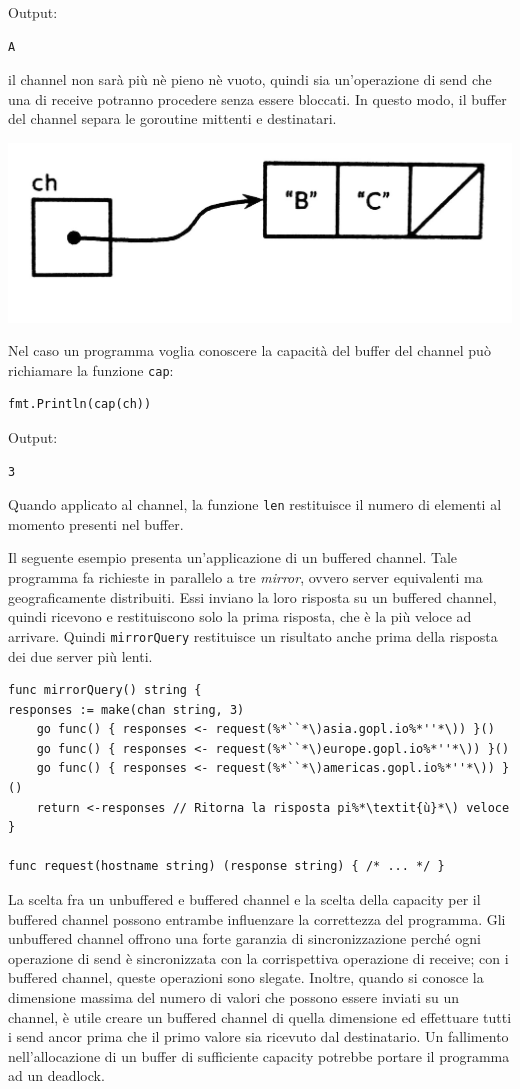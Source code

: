 Output:
\begin{lstlisting}[language=bash, frame=L, label={lst:lstlisting7-4-4.4}]
A
\end{lstlisting}
il channel non sarà più nè pieno nè vuoto, quindi sia un'operazione di send che una di receive potranno procedere senza essere bloccati.
In questo modo, il buffer del channel separa le goroutine mittenti e destinatari.
\begin{center}
    \includegraphics[width=0.5\linewidth]{figures/figure7.4}
\end{center}
Nel caso un programma voglia conoscere la capacità del buffer del channel può richiamare la funzione \verb|cap|:
\begin{lstlisting}[frame=single, label={lst:lstlisting7-4-4.5}]
fmt.Println(cap(ch))
\end{lstlisting}
Output:
\begin{lstlisting}[language=bash, frame=L, label={lst:lstlisting7-4-4.6}]
3
\end{lstlisting}
Quando applicato al channel, la funzione \verb|len| restituisce il numero di elementi al momento presenti nel buffer.

Il seguente esempio presenta un'applicazione di un buffered channel.
Tale programma fa richieste in parallelo a tre \textit{mirror}, ovvero server equivalenti ma geograficamente distribuiti.
Essi inviano la loro risposta su un buffered channel, quindi ricevono e restituiscono solo la prima risposta, che è la più veloce ad arrivare.
Quindi \verb|mirrorQuery| restituisce un risultato anche prima della risposta dei due server più lenti.
\begin{lstlisting}[frame=single, label={lst:lstlisting7-4-4.7}]
func mirrorQuery() string {
responses := make(chan string, 3)
    go func() { responses <- request(%*``*\)asia.gopl.io%*''*\)) }()
    go func() { responses <- request(%*``*\)europe.gopl.io%*''*\)) }()
    go func() { responses <- request(%*``*\)americas.gopl.io%*''*\)) }()
    return <-responses // Ritorna la risposta pi%*\textit{ù}*\) veloce
}

func request(hostname string) (response string) { /* ... */ }
\end{lstlisting}
La scelta fra un unbuffered e buffered channel e la scelta della capacity per il buffered channel possono entrambe influenzare la correttezza del programma.
Gli unbuffered channel offrono una forte garanzia di sincronizzazione perché ogni operazione di send è sincronizzata con la corrispettiva operazione di receive;
con i buffered channel, queste operazioni sono slegate.
Inoltre, quando si conosce la dimensione massima del numero di valori che possono essere inviati su un channel, è utile creare un buffered channel di quella dimensione ed effettuare tutti i send ancor prima che il primo valore sia ricevuto dal destinatario.
Un fallimento nell'allocazione di un buffer di sufficiente capacity potrebbe portare il programma ad un deadlock.


